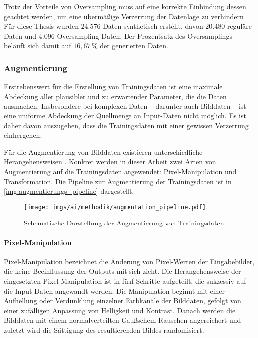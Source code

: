 Trotz der Vorteile von Oversampling muss auf eine korrekte Einbindung dessen geachtet werden, um eine übermäßige Verzerrung der Datenlage zu verhindern \cite{oversampling_bad}. Für diese Thesis wurden $24.576$ Daten synthetisch erstellt, davon $20.480$ reguläre Daten und $4.096$ Oversampling-Daten. Der Prozentsatz des Oversamplings beläuft sich damit auf $16,\!67\,\%$ der generierten Daten.


\subsubsection{Augmentierung}
\label{sec:daten_augmentierung}

Erstrebenswert für die Erstellung von Trainingsdaten ist eine maximale Abdeckung aller plausibler und zu erwartender Parameter, die die Daten ausmachen. Insbesondere bei komplexen Daten -- darunter auch Bilddaten -- ist eine uniforme Abdeckung der Quellmenge an Input-Daten nicht möglich. Es ist daher davon auszugehen, dass die Trainingsdaten mit einer gewissen Verzerrung einhergehen.

Für die Augmentierung von Bilddaten existieren unterschiedliche Herangehensweisen \cite{augmentierung_techniken}. Konkret werden in dieser Arbeit zwei Arten von Augmentierung auf die Trainingsdaten angewendet: Pixel-Manipulation und Transformation. Die Pipeline zur Augmentierung der Trainingsdaten ist in \autoref{img:augmentierungs_pipeline} dargestellt.

\begin{figure}
    \centering
    \texttt{[image: imgs/ai/methodik/augmentation\_pipeline.pdf]}
    \caption{Schematische Darstellung der Augmentierung von Trainingsdaten.}
    \label{img:augmentierungs_pipeline}
\end{figure}

\paragraph{Pixel-Manipulation}

Pixel-Manipulation bezeichnet die Änderung von Pixel-Werten der Eingabebilder, die keine Beeinflussung der Outputs mit sich zieht. Die Herangehensweise der eingesetzten Pixel-Manipulation ist in fünf Schritte aufgeteilt, die sukzessiv auf die Input-Daten angewandt werden. Die Manipulation beginnt mit einer Aufhellung oder Verdunklung einzelner Farbkanäle der Bilddaten, gefolgt von einer zufälligen Anpassung von Helligkeit und Kontrast. Danach werden die Bilddaten mit einem normalverteilten Gaußschem Rauschen angereichert und zuletzt wird die Sättigung des resultierenden Bildes randomisiert.

